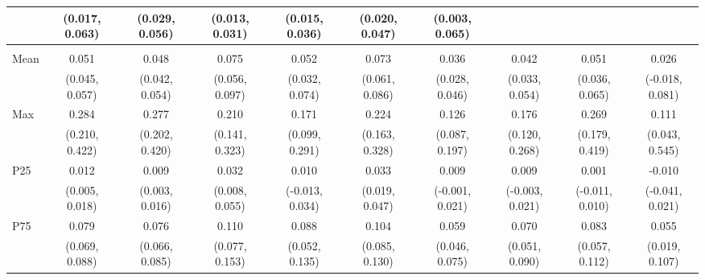 {\begin{tabular}{l|c|c|c|c|c|c|c|c|c}
& {\scriptsize (0.017, 0.063)}
& {\scriptsize (0.029, 0.056)}
& {\scriptsize (0.013, 0.031)}
& {\scriptsize (0.015, 0.036)}
& {\scriptsize (0.020, 0.047)}
& {\scriptsize (0.003, 0.065)}
\\ [0.1cm]
\hline
\noalign{\smallskip}
\multicolumn{10}{l}{\textbf{Effect with Leads and Lags}} \\
\noalign{\smallskip}
\hline
Mean
& 0.051 & 0.048 & 0.075 & 0.052 & 0.073 & 0.036 & 0.042 & 0.051 & 0.026 \\
& {\scriptsize (0.045, 0.057)}
& {\scriptsize (0.042, 0.054)}
& {\scriptsize (0.056, 0.097)}
& {\scriptsize (0.032, 0.074)}
& {\scriptsize (0.061, 0.086)}
& {\scriptsize (0.028, 0.046)}
& {\scriptsize (0.033, 0.054)}
& {\scriptsize (0.036, 0.065)}
& {\scriptsize (-0.018, 0.081)}
\\ [0.1cm]
\hline
Max
& 0.284 & 0.277 & 0.210 & 0.171 & 0.224 & 0.126 & 0.176 & 0.269 & 0.111 \\
& {\scriptsize (0.210, 0.422)}
& {\scriptsize (0.202, 0.420)}
& {\scriptsize (0.141, 0.323)}
& {\scriptsize (0.099, 0.291)}
& {\scriptsize (0.163, 0.328)}
& {\scriptsize (0.087, 0.197)}
& {\scriptsize (0.120, 0.268)}
& {\scriptsize (0.179, 0.419)}
& {\scriptsize (0.043, 0.545)}
\\ [0.1cm]
\hline
P25
& 0.012 & 0.009 & 0.032 & 0.010 & 0.033 & 0.009 & 0.009 & 0.001 & -0.010 \\
& {\scriptsize (0.005, 0.018)}
& {\scriptsize (0.003, 0.016)}
& {\scriptsize (0.008, 0.055)}
& {\scriptsize (-0.013, 0.034)}
& {\scriptsize (0.019, 0.047)}
& {\scriptsize (-0.001, 0.021)}
& {\scriptsize (-0.003, 0.021)}
& {\scriptsize (-0.011, 0.010)}
& {\scriptsize (-0.041, 0.021)}
\\ [0.1cm]
\hline
P75
& 0.079 & 0.076 & 0.110 & 0.088 & 0.104 & 0.059 & 0.070 & 0.083 & 0.055 \\
& {\scriptsize (0.069, 0.088)}
& {\scriptsize (0.066, 0.085)}
& {\scriptsize (0.077, 0.153)}
& {\scriptsize (0.052, 0.135)}
& {\scriptsize (0.085, 0.130)}
& {\scriptsize (0.046, 0.075)}
& {\scriptsize (0.051, 0.090)}
& {\scriptsize (0.057, 0.112)}
& {\scriptsize (0.019, 0.107)}
\\ [0.1cm]
\hline
\hline
\end{tabular}
}

